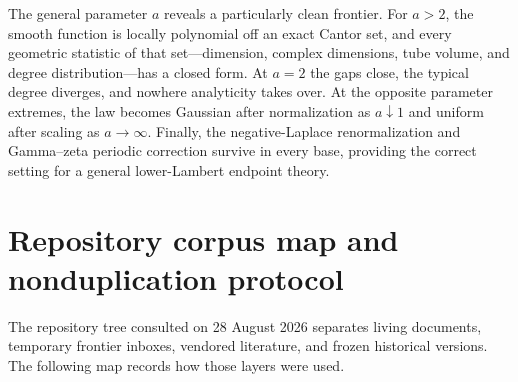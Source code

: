 \documentclass[11pt,oneside]{article}
\theoremstyle{definition}
\theoremstyle{remark}
\begin{document}
The general parameter $a$ reveals a particularly clean frontier.  For $a>2$, the smooth
function is locally polynomial off an exact Cantor set, and every geometric statistic of
that set---dimension, complex dimensions, tube volume, and degree distribution---has a closed
form.  At $a=2$ the gaps close, the typical degree diverges, and nowhere analyticity takes
over.  At the opposite parameter extremes, the law becomes Gaussian after normalization as
$a\downarrow1$ and uniform after scaling as $a\to\infty$.  Finally, the negative-Laplace
renormalization and Gamma--zeta periodic correction survive in every base, providing the
correct setting for a general lower-Lambert endpoint theory.

\appendix

\section{Repository corpus map and nonduplication protocol}
\label{app:repo-audit}

The repository tree consulted on 28 August 2026 separates living documents, temporary frontier
inboxes, vendored literature, and frozen historical versions.  The following map records how
those layers were used.
\end{document}
